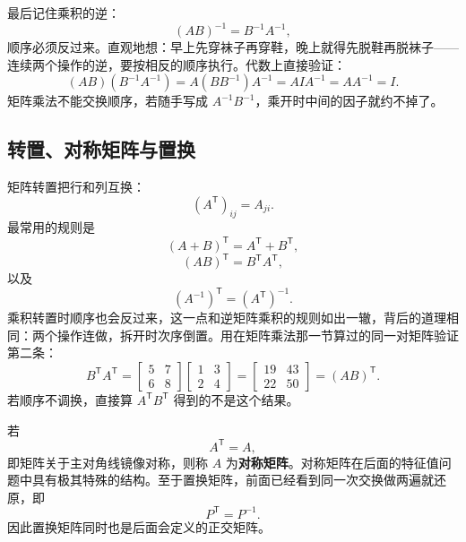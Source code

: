 \documentclass[UTF8,a4paper,12pt]{ctexart}
\numberwithin{equation}{section}
\newcommand{\trans}{^{\mathsf T}}
\begin{document}
	最后记住乘积的逆：
	\begin{equation}\label{eq:4.46}
	(AB)^{-1}=B^{-1}A^{-1},
	\end{equation}
	顺序必须反过来。直观地想：早上先穿袜子再穿鞋，晚上就得先脱鞋再脱袜子——连续两个操作的逆，要按相反的顺序执行。代数上直接验证：
	\begin{equation}\label{eq:4.47}
	(AB)(B^{-1}A^{-1})
	=A(BB^{-1})A^{-1}
	=AIA^{-1}
	=AA^{-1}
	=I.
	\end{equation}
	矩阵乘法不能交换顺序，若随手写成 $A^{-1}B^{-1}$，乘开时中间的因子就约不掉了。
	
	\subsection{转置、对称矩阵与置换}
	
	矩阵转置把行和列互换：
	\begin{equation}\label{eq:4.48}
	(A\trans)_{ij}=A_{ji}.
	\end{equation}
	最常用的规则是
	\begin{equation}\label{eq:4.49}
	(A+B)\trans=A\trans+B\trans,
	\end{equation}
	\begin{equation}\label{eq:4.50}
	(AB)\trans=B\trans A\trans,
	\end{equation}
	以及
	\begin{equation}\label{eq:4.51}
	(A^{-1})\trans=(A\trans)^{-1}.
	\end{equation}
	乘积转置时顺序也会反过来，这一点和逆矩阵乘积的规则如出一辙，背后的道理相同：两个操作连做，拆开时次序倒置。用在矩阵乘法那一节算过的同一对矩阵验证第二条：
	\begin{equation}\label{eq:4.52}
	B\trans A\trans
	=
	\begin{bmatrix}
		5&7\\
		6&8
	\end{bmatrix}
	\begin{bmatrix}
		1&3\\
		2&4
	\end{bmatrix}
	=
	\begin{bmatrix}
		19&43\\
		22&50
	\end{bmatrix}
	=
	(AB)\trans.
	\end{equation}
	若顺序不调换，直接算 $A\trans B\trans$ 得到的不是这个结果。
	
	若
	\begin{equation}\label{eq:4.53}
	A\trans=A,
	\end{equation}
	即矩阵关于主对角线镜像对称，则称 $A$ 为\textbf{对称矩阵}。对称矩阵在后面的特征值问题中具有极其特殊的结构。至于置换矩阵，前面已经看到同一次交换做两遍就还原，即
	\begin{equation}\label{eq:4.54}
	P\trans=P^{-1}.
	\end{equation}
	因此置换矩阵同时也是后面会定义的正交矩阵。
	
\end{document}
